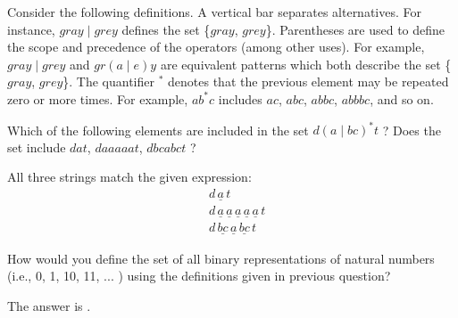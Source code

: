 \documentclass{ximera}
\begin{document}
\begin{question}
Consider the following definitions.  
A vertical bar separates alternatives. For instance, $gray  \mid grey$ defines the set \{$gray$, $grey$\}.
Parentheses are used to define the scope and precedence of the operators (among other uses). For example, $gray \mid grey$ and $gr(a\mid e)y$ are equivalent patterns which both describe the set 
 \{$gray$, $grey$\}.
The quantifier $^*$ denotes that the previous element may be repeated zero or more times. 
 For example, $ab^*c$ includes $ac$, $abc$, $abbc$, $abbbc$, and so on.

Which of the following elements are included in the set $d (a \mid bc)^*t  $ ?
Does the set  include $dat$, $daaaaat$, $dbcabct$ ?  

\begin{solution}
\begin{multiple-choice}
\end{multiple-choice}
\end{solution}
 
All three strings match the given expression:
\begin{align*}
&d \, \underline{a} \, t\\
&d \, \underline{a} \, \underline{a} \, \underline{a} \, \underline{a} \, \underline{a} \, t\\
&d \, \underline{bc} \, \underline{a} \, \underline{bc} \, t
\end{align*}
\end{question}

\begin{question}
How would you define the set of all binary representations of natural numbers (i.e., 0, 1, 10, 11, ... ) using the definitions given in previous question?

\begin{solution}%
The answer is .
\end{solution}
\end{question}
\end{document}
